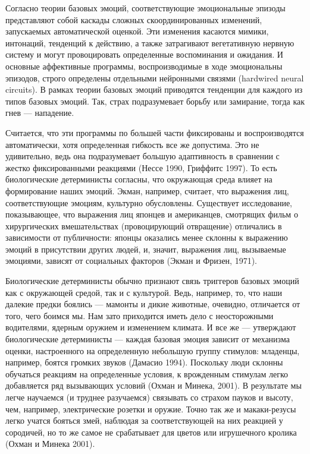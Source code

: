 \documentclass[11pt]{book}
\begin{document}
Согласно теории базовых эмоций, соответствующие эмоциональные эпизоды представляют собой каскады сложных скоординированных изменений, запускаемых автоматической оценкой. Эти изменения касаются мимики, интонаций, тенденций к действию, а также затрагивают вегетативную нервную систему и могут провоцировать определенные воспоминания и ожидания. И основные аффективные программы, воспроизводимые в ходе эмоциональны эпизодов, строго определены отдельными нейронными связями (hardwired neural circuits). В рамках теории базовых эмоций приводятся тенденции для каждого из типов базовых эмоций. Так, страх подразумевает борьбу или замирание, тогда как гнев --- нападение.

Считается, что эти программы по большей части фиксированы и воспроизводятся автоматически, хотя определенная гибкость все же допустима. Это не удивительно, ведь она подразумевает большую адаптивность в сравнении с жестко фиксированными реакциями (Нессе 1990, Гриффитс 1997). То есть биологические детерминисты согласны, что окружающая среда влияет на формирование наших эмоций. Экман, например, считает, что выражения лиц, соответствующие эмоциям, культурно обусловлены. Существует исследование, показывающее, что выражения лиц японцев и американцев, смотрящих фильм о хирургических вмешательствах (провоцирующий отвращение) отличались в зависимости от публичности: японцы оказались менее склонны к выражению эмоций в присутствии других людей, и, значит, выражения лиц, вызываемые эмоциями, зависят от социальных факторов (Экман и Фризен, 1971).

Биологические детерминисты обычно признают связь триггеров базовых эмоций как с окружающей средой, так и с культурой. Ведь, например, то, что наши далекие предки боялись --- мамонты и дикие животные, очевидно, отличается от того, чего боимся мы. Нам зато приходится иметь дело с неосторожными водителями, ядерным оружием и изменением климата. И все же --- утверждают биологические детерминисты --- каждая базовая эмоция зависит от механизма оценки, настроенного на определенную небольшую группу стимулов: младенцы, например, боятся громких звуков (Дамасио 1994). Поскольку люди склонны обучаться реакциям на определенные условия, к врожденным стимулам легко добавляется ряд вызывающих условий (Охман и Минека, 2001). В результате мы легче научаемся (и труднее разучаемся) связывать со страхом пауков и высоту, чем, например, электрические розетки и оружие. Точно так же и макаки-резусы легко учатся бояться змей, наблюдая за соответствующей на них реакцией у сородичей, но то же самое не срабатывает для цветов или игрушечного кролика (Охман и Минека 2001).
\end{document}
